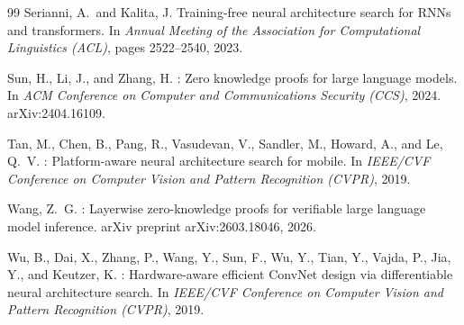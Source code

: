 \documentclass[10pt]{article}
\begin{document}
\begin{thebibliography}{99}
Serianni, A.\ and Kalita, J.
\newblock Training-free neural architecture search for {RNNs} and transformers.
\newblock In \emph{Annual Meeting of the Association for Computational
  Linguistics (ACL)}, pages 2522--2540, 2023.

Sun, H., Li, J., and Zhang, H.
: Zero knowledge proofs for large language models.
\newblock In \emph{ACM Conference on Computer and Communications Security
  (CCS)}, 2024. arXiv:2404.16109.

Tan, M., Chen, B., Pang, R., Vasudevan, V., Sandler, M., Howard, A., and
  Le, Q.~V.
: Platform-aware neural architecture search for mobile.
\newblock In \emph{IEEE/CVF Conference on Computer Vision and Pattern
  Recognition (CVPR)}, 2019.

Wang, Z.~G.
: Layerwise zero-knowledge proofs for verifiable large
  language model inference.
\newblock arXiv preprint arXiv:2603.18046, 2026.

Wu, B., Dai, X., Zhang, P., Wang, Y., Sun, F., Wu, Y., Tian, Y., Vajda, P.,
  Jia, Y., and Keutzer, K.
: Hardware-aware efficient {ConvNet} design via differentiable
  neural architecture search.
\newblock In \emph{IEEE/CVF Conference on Computer Vision and Pattern
  Recognition (CVPR)}, 2019.

\end{thebibliography}
\end{document}
